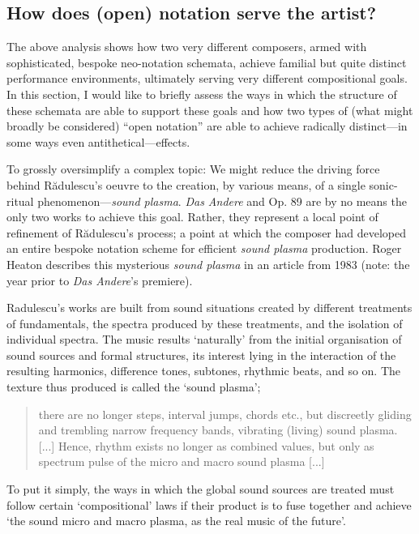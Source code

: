 \subsection{How does (open) notation serve the artist?}

    The above analysis shows how two very different composers, armed with sophisticated, bespoke neo-notation schemata, achieve familial but quite distinct performance environments, ultimately serving very different compositional goals. In this section, I would like to briefly assess the ways in which the structure of these schemata are able to support these goals and how two types of (what might broadly be considered) ``open notation'' are able to achieve radically distinct---in some ways even antithetical---effects.

    To grossly oversimplify a complex topic: We might reduce the driving force behind R\u{a}dulescu's oeuvre to the creation, by various means, of a single sonic-ritual phenomenon---\textit{sound plasma}. \textit{Das Andere} and Op. 89 are by no means the only two works to achieve this goal. Rather, they represent a local point of refinement of R\u{a}dulescu's process; a point at which the composer had developed an entire bespoke notation scheme for efficient \textit{sound plasma} production. Roger Heaton describes this mysterious \textit{sound plasma} in an article from 1983 (note: the year prior to \textit{Das Andere}'s premiere).

        \begin{smallquote}
            Radulescu's works are built from sound situations created by different treatments of fundamentals, the spectra produced by these treatments, and the isolation of individual spectra. The music results `naturally' from the initial organisation of sound sources and formal structures, its interest lying in the interaction of the resulting harmonics, difference tones, subtones, rhythmic beats, and so on. The texture thus produced is called the `sound plasma';
            \begin{quote}
                there are no longer steps, interval jumps, chords etc., but discreetly gliding and trembling narrow frequency bands, vibrating (living) sound plasma. [...] Hence, rhythm exists no longer as combined values, but only as spectrum pulse of the micro and macro sound plasma [...]\autocite{Radulescu_1975}
            \end{quote}
            To put it simply, the ways in which the global sound sources are treated must follow certain `compositional' laws if their product is to fuse together and achieve `the sound micro and macro plasma, as the real music of the future'.\autocite[23--4]{Heaton_1983}
        \end{smallquote}

